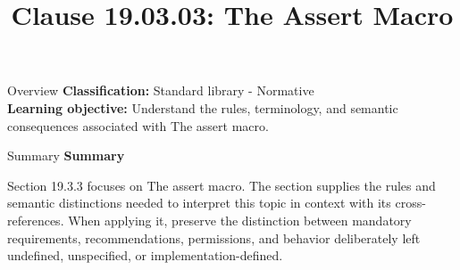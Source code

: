 \documentclass[10pt,letterpaper]{article}
\title{Clause 19.03.03: The Assert Macro}
\author{}
\date{}
\begin{document}
\maketitle
\begin{CornellOverviewBox}{Overview}
\textbf{Classification:} Standard library - Normative\\[2pt]
\textbf{Learning objective:} Understand the rules, terminology, and semantic consequences associated with The assert macro.
\end{CornellOverviewBox}\begin{CornellSummaryBox}{Summary}
{\sffamily\bfseries\color{Accent} Summary}\par\vspace{3pt}Section 19.3.3 focuses on The assert macro. The section supplies the rules and semantic distinctions needed to interpret this topic in context with its cross-references. When applying it, preserve the distinction between mandatory requirements, recommendations, permissions, and behavior deliberately left undefined, unspecified, or implementation-defined.
\end{CornellSummaryBox}
\end{document}
